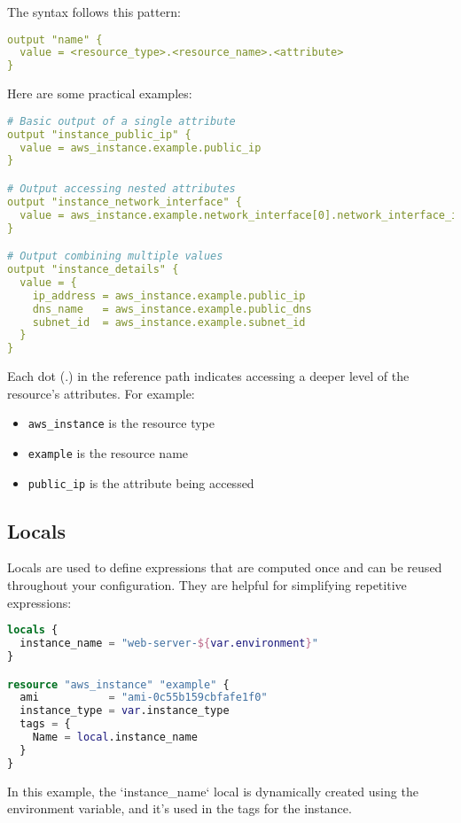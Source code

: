 The syntax follows this pattern:
\begin{lstlisting}[language=yaml]
output "name" {
  value = <resource_type>.<resource_name>.<attribute>
}
\end{lstlisting}

Here are some practical examples:

\begin{lstlisting}[language=yaml]
# Basic output of a single attribute
output "instance_public_ip" {
  value = aws_instance.example.public_ip
}

# Output accessing nested attributes
output "instance_network_interface" {
  value = aws_instance.example.network_interface[0].network_interface_id
}

# Output combining multiple values
output "instance_details" {
  value = {
    ip_address = aws_instance.example.public_ip
    dns_name   = aws_instance.example.public_dns
    subnet_id  = aws_instance.example.subnet_id
  }
}
\end{lstlisting}

Each dot (.) in the reference path indicates accessing a deeper level of the resource's attributes. For example:
\begin{itemize}
  \item \texttt{aws\_instance} is the resource type
  \item \texttt{example} is the resource name
  \item \texttt{public\_ip} is the attribute being accessed
\end{itemize}

\subsection{Locals}

Locals are used to define expressions that are computed once and can be reused throughout your configuration. They are helpful for simplifying repetitive expressions:

\begin{lstlisting}[language=terraform]
locals {
  instance_name = "web-server-${var.environment}"
}

resource "aws_instance" "example" {
  ami           = "ami-0c55b159cbfafe1f0"
  instance_type = var.instance_type
  tags = {
    Name = local.instance_name
  }
}
\end{lstlisting}

In this example, the `instance\_name` local is dynamically created using the environment variable, and it's used in the tags for the instance.

